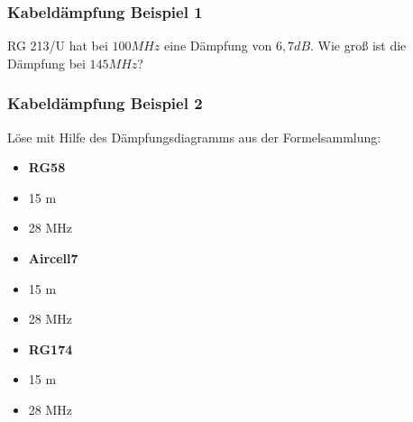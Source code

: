 \begin{frame}
  \frametitle{Kabeldämpfung Beispiel 1}

  \begin{exampleblock}{RG 213/U hat bei $100MHz$ eine Dämpfung von $6,7dB$.
    Wie groß ist die Dämpfung bei $145MHz$?}
  \end{exampleblock}

\end{frame}

\begin{frame}
  \frametitle{Kabeldämpfung Beispiel 2}

  \begin{exampleblock}{Löse mit Hilfe des Dämpfungsdiagramms aus der Formelsammlung:}
    \begin{minipage}{0.3\textwidth}
      \begin{itemize}
        \item \textbf{RG58}\\
        \item 15 m\\
        \item 28 MHz
      \end{itemize}
    \end{minipage}
    \begin{minipage}{0.3\textwidth}
      \begin{itemize}
        \item \textbf{Aircell7}\\
        \item 15 m\\
        \item 28 MHz
      \end{itemize}
    \end{minipage}
    \begin{minipage}{0.3\textwidth}
      \begin{itemize}
        \item \textbf{RG174}\\
        \item 15 m\\
        \item 28 MHz
      \end{itemize}
    \end{minipage}
  \end{exampleblock}
\end{frame}

